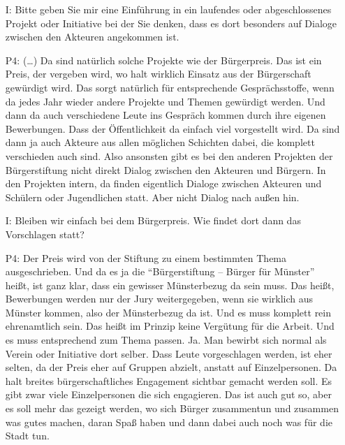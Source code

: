 \begin{itemize}
    \item[I:] Bitte geben Sie mir eine Einf{\"u}hrung in ein laufendes oder abgeschlossenes Projekt oder Initiative bei der Sie denken, dass es dort besonders auf Dialoge zwischen den Akteuren angekommen ist.
    \item[P4:] (\dots) Da sind nat{\"u}rlich solche Projekte wie der B{\"u}rgerpreis. Das ist ein Preis, der vergeben wird, wo halt wirklich Einsatz aus der B{\"u}rgerschaft gew{\"u}rdigt wird. Das sorgt nat{\"u}rlich f{\"u}r entsprechende Gespr{\"a}chsstoffe, wenn da jedes Jahr wieder andere Projekte und Themen gew{\"u}rdigt werden. Und dann da auch verschiedene Leute ins Gespr{\"a}ch kommen durch ihre eigenen Bewerbungen. Dass der {\"O}ffentlichkeit da einfach viel vorgestellt wird. Da sind dann ja auch Akteure aus allen m{\"o}glichen Schichten dabei, die komplett verschieden auch sind. Also ansonsten gibt es bei den anderen Projekten der B{\"u}rgerstiftung nicht direkt Dialog zwischen den Akteuren und B{\"u}rgern. In den Projekten intern, da finden eigentlich Dialoge zwischen Akteuren und Sch{\"u}lern oder Jugendlichen statt. Aber nicht Dialog nach au{\ss}en hin.
    \item[I:] Bleiben wir einfach bei dem B{\"u}rgerpreis. Wie findet dort dann das Vorschlagen statt?
    \item[P4:] Der Preis wird von der Stiftung zu einem bestimmten Thema ausgeschrieben. Und da es ja die "`B{\"u}rgerstiftung -- B{\"u}rger f{\"u}r M{\"u}nster"' hei{\ss}t, ist ganz klar, dass ein gewisser M{\"u}nsterbezug da sein muss. Das hei{\ss}t, Bewerbungen werden nur der Jury weitergegeben, wenn sie wirklich aus M{\"u}nster kommen, also der M{\"u}nsterbezug da ist. Und es muss komplett rein ehrenamtlich sein. Das hei{\ss}t im Prinzip keine Verg{\"u}tung f{\"u}r die Arbeit. Und es muss entsprechend zum Thema passen. Ja. Man bewirbt sich normal als Verein oder Initiative dort selber. Dass Leute vorgeschlagen werden, ist eher selten, da der Preis eher auf Gruppen abzielt, anstatt auf Einzelpersonen. Da halt breites b{\"u}rgerschaftliches Engagement sichtbar gemacht werden soll. Es gibt zwar viele Einzelpersonen die sich engagieren. Das ist auch gut so, aber es soll mehr das gezeigt werden, wo sich B{\"u}rger zusammentun und zusammen was gutes machen, daran Spa{\ss} haben und dann dabei auch noch was f{\"u}r die Stadt tun.
\end{itemize}

